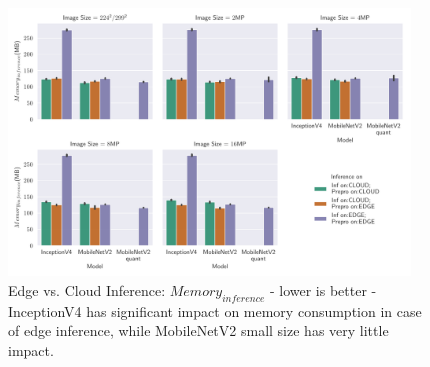 \begin{figure}[!htb]
\centering
\includegraphics[width=0.95\textwidth]{./Bilder/single_plots/edge_vs_cloud_plots/Edge_vs_Cloud_Inference_Inference_Memory.pdf}
\caption[{Edge vs. Cloud Inference:  $Memory_{inference}$ - lower is better}]{Edge vs. Cloud Inference:  $Memory_{inference}$ - lower is better - InceptionV4 has significant impact on memory consumption in case of edge inference, while MobileNetV2 small size has very little impact.}
\label{fig:EdgeVsCloudInferenceMemory}
\end{figure}

